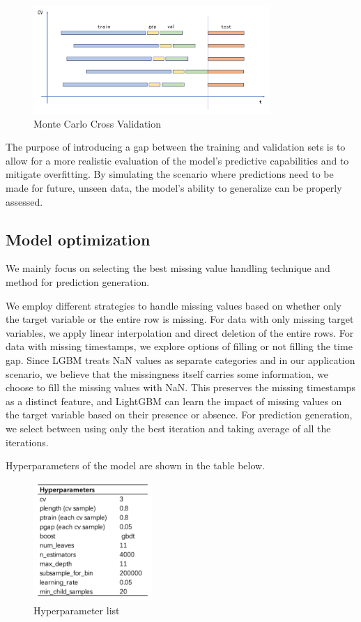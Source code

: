 \documentclass{article}
\begin{document}
\begin{figure}[H]
	\centering
	\includegraphics[width=0.8\textwidth]{Model/Demonstration of MC.jpg}
	\caption{Monte Carlo Cross Validation}
\end{figure}


The purpose of introducing a gap between the training and validation sets is to allow for a more realistic evaluation of the model's predictive capabilities and to mitigate overfitting. By simulating the scenario where predictions need to be made for future, unseen data, the model's ability to generalize can be properly assessed.



\subsection{Model optimization}
We mainly focus on selecting the best missing value handling technique and method for prediction generation. 

We employ different strategies to handle missing values based on whether only the target variable or the entire row is missing. For data with only missing target variables, we apply linear interpolation and direct deletion of the entire rows. For data with missing timestamps, we explore options of filling or not filling the time gap. Since LGBM treats NaN values as separate categories and in our application scenario, we believe that the missingness itself carries some information, we choose to fill the missing values with NaN. This preserves the missing timestamps as a distinct feature, and LightGBM can learn the impact of missing values on the target variable based on their presence or absence. For prediction generation, we select between using only the best iteration and taking average of all the iterations.

Hyperparameters of the model are shown in the table below. 


\begin{figure}[H]
	\centering
	\includegraphics[width=0.4\textwidth]{Model/Hyperparameter.png}
	\caption{Hyperparameter list}
\end{figure}
\end{document}
